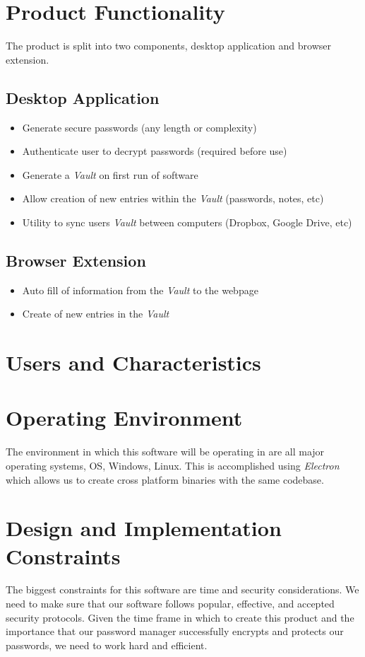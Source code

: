 \documentclass{report}
\begin{document}
\section{Product Functionality}
The product is split into two components, desktop application and browser
extension. 

\subsection{Desktop Application}
\begin{itemize}
    \item Generate secure passwords (any length or complexity)
    \item Authenticate user to decrypt passwords (required before use)
    \item Generate a \textit{Vault} on first run of software
    \item Allow creation of new entries within the \textit{Vault} (passwords, notes, etc)
    \item Utility to sync users \textit{Vault} between computers (Dropbox, Google Drive, etc)
\end{itemize}
\subsection{Browser Extension}
\begin{itemize}
    \item Auto fill of information from the \textit{Vault} to the webpage
    \item Create of new entries in the \textit{Vault}
\end{itemize}

\section{Users and Characteristics}

\section{Operating Environment}
The environment in which this software will be operating in are all
major operating systems, OS, Windows, Linux. This is accomplished using
\textit{Electron} which allows us to create cross platform binaries
with the same codebase.

\section{Design and Implementation Constraints}
The biggest constraints for this software are time and security considerations.
We need to make sure that our software follows popular, effective, and
accepted security protocols. Given the time frame in which to create this
product and the importance that our password manager successfully encrypts
and protects our passwords, we need to work hard and efficient.
\end{document}
